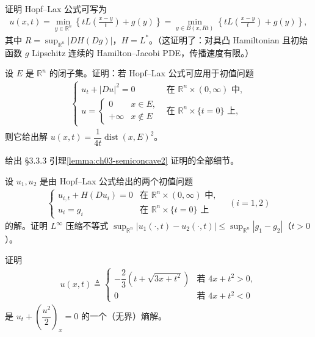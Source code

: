 \documentclass[../../main.tex]{subfiles}
\begin{document}
\begin{exercise}\label{exercise:ch03-13}
证明 Hopf--Lax 公式可写为
\begin{align*}
u(x,t)=\min_{y\in\mathbb{R}^n}\left\{tL\!\left(\frac{x-y}{t}\right)+g(y)\right\}
=\min_{y\in B(x,Rt)}\left\{tL\!\left(\frac{x-y}{t}\right)+g(y)\right\},
\end{align*}
其中 $R=\sup_{\mathbb{R}^n}|DH(Dg)|$，$H=L^*$。（这证明了：对具凸 Hamiltonian 且初始函数 $g$ Lipschitz 连续的 Hamilton--Jacobi PDE，传播速度有限。）
\end{exercise}

\begin{exercise}\label{exercise:ch03-14}
设 $E$ 是 $\mathbb{R}^n$ 的闭子集。证明：若 Hopf--Lax 公式可应用于初值问题
\begin{align*}
\begin{cases}
u_t+|Du|^2=0 & \text{在 }\mathbb{R}^n\times(0,\infty)\text{ 中},\\
u=
\begin{cases}
0 & x\in E,\\
+\infty & x\notin E
\end{cases}
& \text{在 }\mathbb{R}^n\times\{t=0\}\text{ 上},
\end{cases}
\end{align*}
则它给出解 $u(x,t)=\dfrac{1}{4t}\operatorname{dist}(x,E)^2$。
\end{exercise}

\begin{exercise}\label{exercise:ch03-15}
给出 \S3.3.3 引理\cref{lemma:ch03-semiconcave2} 证明的全部细节。
\end{exercise}

\begin{exercise}\label{exercise:ch03-16}
设 $u_1,u_2$ 是由 Hopf--Lax 公式给出的两个初值问题
\begin{align*}
\begin{cases}
u_{i,t}+H(Du_i)=0 & \text{在 }\mathbb{R}^n\times(0,\infty)\text{ 中},\\
u_i=g_i & \text{在 }\mathbb{R}^n\times\{t=0\}\text{ 上}
\end{cases}\quad(i=1,2)
\end{align*}
的解。证明 $L^\infty$ 压缩不等式 $\sup_{\mathbb{R}^n}|u_1(\cdot,t)-u_2(\cdot,t)|\leqslant\sup_{\mathbb{R}^n}|g_1-g_2|$（$t>0$）。
\end{exercise}

\begin{exercise}\label{exercise:ch03-17}
证明
\begin{align*}
u(x,t)\triangleq
\begin{cases}
-\dfrac{2}{3}\left(t+\sqrt{3x+t^2}\right) & \text{若 }4x+t^2>0,\\
0 & \text{若 }4x+t^2<0
\end{cases}
\end{align*}
是 $u_t+\left(\dfrac{u^2}{2}\right)_x=0$ 的一个（无界）熵解。
\end{exercise}
\end{document}
